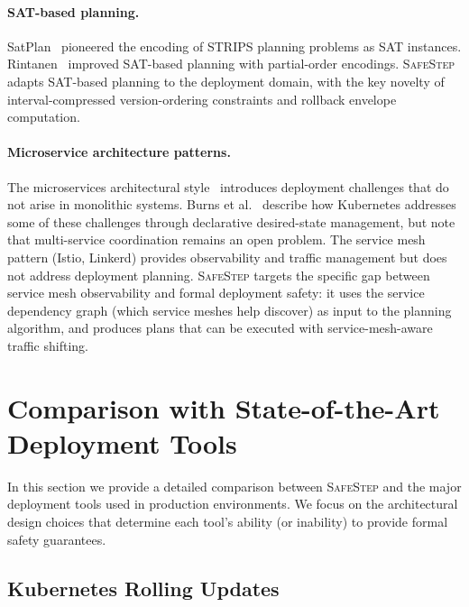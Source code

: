 \documentclass[10pt,twocolumn]{article}
\newcommand{\safestep}{\textsc{SafeStep}}
\begin{document}
\paragraph{SAT-based planning.}
SatPlan~\cite{kautz-satplan-1992} pioneered the encoding of
STRIPS planning problems as SAT instances.
Rintanen~\cite{rintanen-planning-2012} improved SAT-based
planning with partial-order encodings. \safestep{} adapts
SAT-based planning to the deployment domain, with the key
novelty of interval-compressed version-ordering constraints
and rollback envelope computation.

\paragraph{Microservice architecture patterns.}
The microservices architectural style~\cite{taibi-microservices-2017}
introduces deployment challenges that do not arise in monolithic
systems. Burns et al.~\cite{burns-kubernetes-2016} describe how
Kubernetes addresses some of these challenges through declarative
desired-state management, but note that multi-service coordination
remains an open problem. The service mesh pattern (Istio, Linkerd)
provides observability and traffic management but does not address
deployment planning. \safestep{} targets the specific gap between
service mesh observability and formal deployment safety: it uses
the service dependency graph (which service meshes help discover)
as input to the planning algorithm, and produces plans that can
be executed with service-mesh-aware traffic shifting.

\section{Comparison with State-of-the-Art Deployment Tools}
\label{sec:sota}

In this section we provide a detailed comparison between
\safestep{} and the major deployment tools used in production
environments. We focus on the architectural design choices that
determine each tool's ability (or inability) to provide formal
safety guarantees.

\subsection{Kubernetes Rolling Updates}
\end{document}
